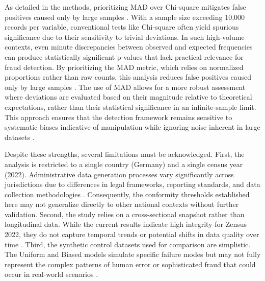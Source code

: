 \documentclass[11pt,a4paper]{article}
\begin{document}
As detailed in the methods, prioritizing MAD over Chi-square mitigates false positives caused only by large samples \cite{Kossovsky2021OnTM}. With a sample size exceeding 10,000 records per variable, conventional tests like Chi-square often yield spurious significance due to their sensitivity to trivial deviations. In such high-volume contexts, even minute discrepancies between observed and expected frequencies can produce statistically significant p-values that lack practical relevance for fraud detection. By prioritizing the MAD metric, which relies on normalized proportions rather than raw counts, this analysis reduces false positives caused only by large samples \cite{Kossovsky2021OnTM}. The use of MAD allows for a more robust assessment where deviations are evaluated based on their magnitude relative to theoretical expectations, rather than their statistical significance in an infinite-sample limit. This approach ensures that the detection framework remains sensitive to systematic biases indicative of manipulation while ignoring noise inherent in large datasets \cite{Kossovsky2021OnTM}.

Despite these strengths, several limitations must be acknowledged. First, the analysis is restricted to a single country (Germany) and a single census year (2022). Administrative data generation processes vary significantly across jurisdictions due to differences in legal frameworks, reporting standards, and data collection methodologies \cite{Tosic2021UseOB}. Consequently, the conformity thresholds established here may not generalize directly to other national contexts without further validation. Second, the study relies on a cross-sectional snapshot rather than longitudinal data. While the current results indicate high integrity for Zensus 2022, they do not capture temporal trends or potential shifts in data quality over time \cite{Druica2018BenfordsLA}. Third, the synthetic control datasets used for comparison are simplistic. The Uniform and Biased models simulate specific failure modes but may not fully represent the complex patterns of human error or sophisticated fraud that could occur in real-world scenarios \cite{Mumic2021AMT}.
\end{document}
